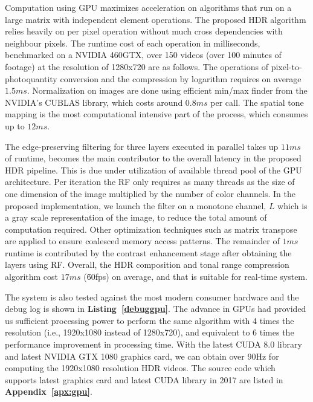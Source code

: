 Computation using GPU maximizes acceleration on algorithms that run on a large matrix with 
independent element operations. The proposed HDR algorithm relies heavily on per pixel operation 
without much cross dependencies with neighbour pixels. The runtime cost of each operation in 
milliseconds, benchmarked on a NVIDIA 460GTX, over 150 videos (over 100 minutes of footage) at 
the resolution of 1280x720 are as follows. The operations of pixel-to-photoquantity conversion and 
the compression by logarithm requires on average $1.5ms$. Normalization on images are done using 
efficient min/max finder from the NVIDIA's CUBLAS library, which costs around $0.8ms$ per call. The 
spatial tone mapping is the most computational intensive part of the process, which consumes up to $12ms$. 

The edge-preserving filtering for three layers executed in parallel takes up $11ms$ of runtime, 
becomes the main contributor to the overall latency in the proposed HDR pipeline. This is due under 
utilization of available thread pool of the GPU architecture.  Per iteration the RF only requires as many 
threads as the size of one dimension of the image multiplied by the number of color channels. In the 
proposed implementation, we launch the filter on a monotone channel, $L$ which is a gray scale 
representation of the image, to reduce the total amount of computation required. Other optimization 
techniques such as matrix transpose are applied to ensure coalesced memory access patterns. The 
remainder of $1ms$ runtime is contributed by the contrast enhancement stage after obtaining the 
layers using RF. Overall, the HDR composition and tonal range compression algorithm cost $17ms$ 
(\~60fps) on average, and that is suitable for real-time system. 

The system is also tested against the most modern consumer hardware and the debug log is shown in \textbf{Listing~\ref{debuggpu}}. The advance in GPUs had provided us sufficient processing power to perform the same algorithm with 4 times the resolution (i.e., 1920x1080 instead of 1280x720), and equivalent to 6 times the performance improvement in processing time. With the latest CUDA 8.0 library and latest NVIDIA GTX 1080 graphics card, we can obtain over 90Hz for computing the 1920x1080 resolution HDR videos. The source code which supports latest graphics card and latest CUDA library in 2017 are listed in \textbf{Appendix~\ref{apx:gpu}}.
 
